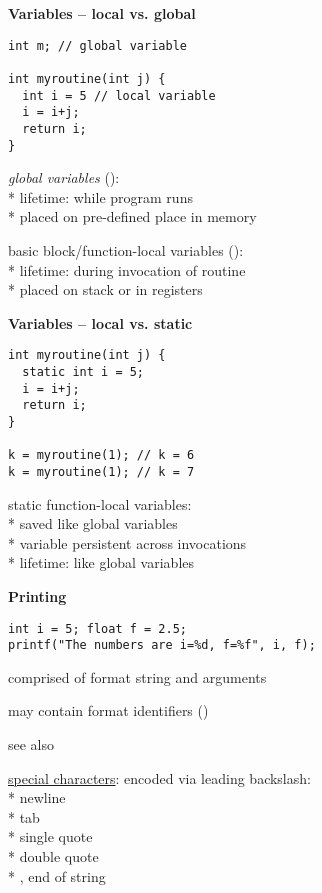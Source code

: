 \newpage

\textbf{Variables -- local vs. global}
\begin{lstlisting}[style=customc]
int m; // global variable

int myroutine(int j) {
  int i = 5 // local variable
  i = i+j;
  return i;
}
\end{lstlisting}
\begin{items}
  \item \emph{global variables} (): \\*
    lifetime: while program runs \\*
    placed on pre-defined place in memory
  \item basic block/function-local variables (): \\*
    lifetime: during invocation of routine \\*
    placed on stack or in registers
\end{items}

\textbf{Variables -- local vs. static}
\begin{lstlisting}[style=customc]
int myroutine(int j) {
  static int i = 5;
  i = i+j;
  return i;
}

k = myroutine(1); // k = 6
k = myroutine(1); // k = 7
\end{lstlisting}
\begin{items}
  \item static function-local variables: \\*
    saved like global variables \\*
    variable persistent across invocations \\*
    lifetime: like global variables
\end{items}

\textbf{Printing}
\begin{lstlisting}[style=customc]
int i = 5; float f = 2.5;
printf("The numbers are i=%d, f=%f", i, f);
\end{lstlisting}
\begin{items}
  \item comprised of format string and arguments
  \item may contain format identifiers ()
  \item see also 
  \item \underline{special characters}: encoded via leading backslash: \\*
    \code{\\n} newline \\*
    \code{\\t} tab \\*
     single quote \\*
     double quote \\*
     , end of string
\end{items}

